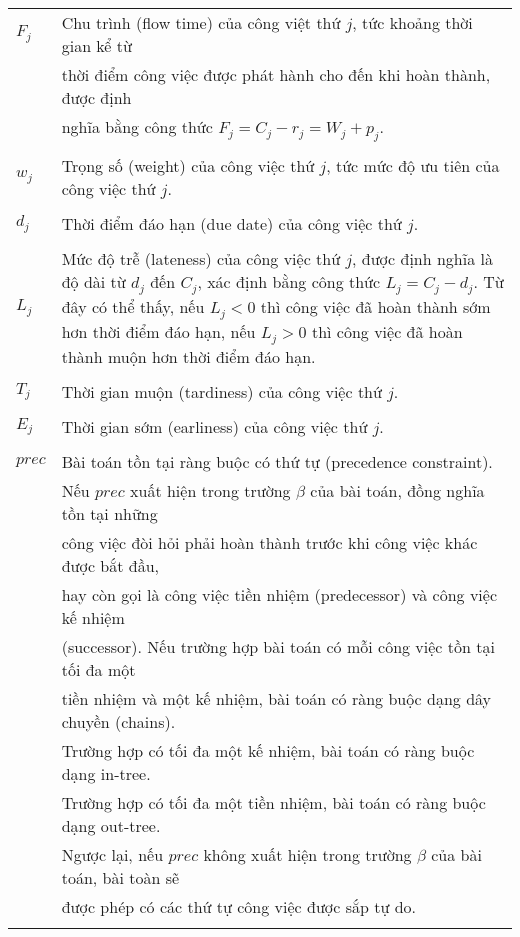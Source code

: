 \documentclass[12pt,a4paper]{report}
\begin{document}
\begin{longtable}{l l}
		$F_j$ & Chu trình (flow time) của công việt thứ $j$, tức khoảng thời gian kể từ \\
		& thời điểm công việc được phát hành cho đến khi hoàn thành, được định \\
		& nghĩa bằng công thức $F_j = C_j - r_j = W_j + p_j$. \\
		\\
		$w_j$ & Trọng số (weight) của công việc thứ $j$, tức mức độ ưu tiên của công việc thứ $j$. \\
		\\
		$d_j$ & Thời điểm đáo hạn (due date) của công việc thứ $j$. \\
		\\
		$L_j$ & Mức độ trễ (lateness) của công việc thứ $j$, được định nghĩa là độ dài từ $d_j$ đến $C_j$, xác định bằng công thức $L_j=C_j-d_j$. Từ đây có thể thấy, nếu $L_j < 0$ thì công việc đã hoàn thành sớm hơn thời điểm đáo hạn, nếu $L_j > 0$ thì công việc đã hoàn thành muộn hơn thời điểm đáo hạn. \\
		\\
		$T_j$ & Thời gian muộn (tardiness) của công việc thứ $j$. \\
		\\
		$E_j$ & Thời gian sớm (earliness) của công việc thứ $j$. \\
		\\
		$prec$ & Bài toán tồn tại ràng buộc có thứ tự (precedence constraint). \\
		& Nếu $prec$ xuất hiện trong trường $\beta$ của bài toán, đồng nghĩa tồn tại những \\
		& công việc đòi hỏi phải hoàn thành trước khi công việc khác được bắt đầu, \\
		& hay còn gọi là công việc tiền nhiệm (predecessor) và công việc kế nhiệm \\
		&(successor). Nếu trường hợp bài toán có mỗi công việc tồn tại tối đa một \\
		& tiền nhiệm và một kế nhiệm, bài toán có ràng buộc dạng dây chuyền (chains). \\
		& Trường hợp có tối đa một kế nhiệm, bài toán có ràng buộc dạng in-tree. \\
		& Trường hợp có tối đa một tiền nhiệm, bài toán có ràng buộc dạng out-tree. \\
		& Ngược lại, nếu $prec$ không xuất hiện trong trường $\beta$ của bài toán, bài toàn sẽ\\
		& được phép có các thứ tự công việc được sắp tự do. \\
		\\

\end{longtable}
\end{document}
